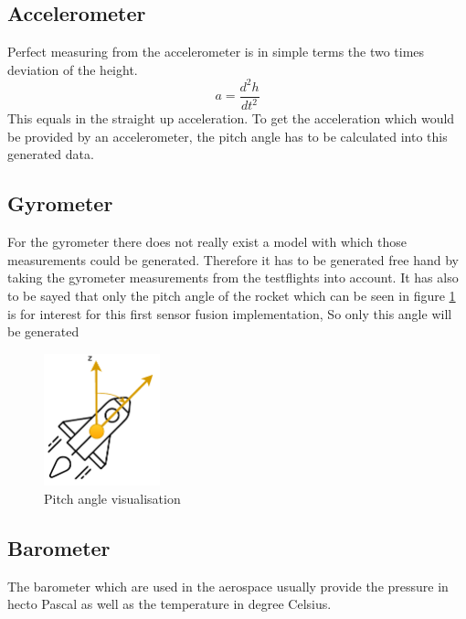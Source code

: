   \subsection{Accelerometer}
  Perfect measuring from the accelerometer is in simple terms the two times deviation of the height.
  $$a = \frac{d^2h}{dt^2}$$
  This equals in the straight up acceleration. To get the acceleration which would be provided by an accelerometer,
  the pitch angle has to be calculated into this generated data.
  
  \subsection{Gyrometer}
  For the gyrometer there does not really exist a model with which those measurements could be generated.
  Therefore it has to be generated free hand by taking the gyrometer measurements from the testflights into account.
  It has also to be sayed that only the pitch angle of the rocket which can be seen in figure \ref{fig:RocketPitchAngle} is for interest for this first sensor fusion implementation,
  So only this angle will be generated
  
  \begin{figure}[h!]
 \centering
 \includegraphics[width = 0.3\textwidth]{./Pictures/RocketSyMod.pdf}
 \caption{Pitch angle visualisation}
 \label{fig:RocketPitchAngle}
\end{figure}

  
  \subsection{Barometer}
  The barometer which are used in the aerospace usually provide the pressure in hecto Pascal as well as the temperature in degree Celsius.
